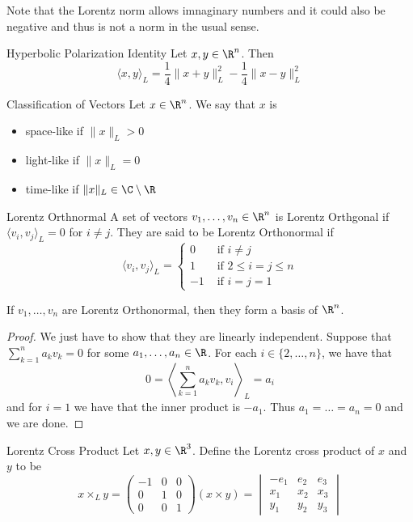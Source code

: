 \documentclass[a4paper]{article}
\begin{document}
Note that the Lorentz norm allows imnaginary numbers and it could also be negative and thus is not a norm in the usual sense. 

\begin{prp}{Hyperbolic Polarization Identity}{} Let $x,y\in\R^n$. Then $$\langle x,y\rangle_L=\frac{1}{4}\|x+y\|_L^2-\frac{1}{4}\|x-y\|_L^2$$
\end{prp}

\begin{defn}{Classification of Vectors}{} Let $x\in\R^n$. We say that $x$ is 
\begin{itemize}
\item space-like if $\|x\|_L>0$
\item light-like if $\|x\|_L=0$
\item time-like if $\|x\|_L\in\C\setminus\R$
\end{itemize}
\end{defn}

\begin{defn}{Lorentz Orthnormal}{} A set of vectors $v_1,\dots,v_n\in\R^n$ is Lorentz Orthgonal if $\langle v_i,v_j\rangle_L=0$ for $i\neq j$. They are said to be Lorentz Orthonormal if $$\langle v_i,v_j\rangle_L=\begin{cases}
0 & \text{ if }i\neq j\\
1 & \text{ if }2\leq i=j\leq n\\
-1 & \text{ if }i=j=1
\end{cases}$$
\end{defn}

\begin{lmm}{}{} If $v_1,\dots,v_n$ are Lorentz Orthonormal, then they form a basis of $\R^n$. \tcbline
\begin{proof}
We just have to show that they are linearly independent. Suppose that $\sum_{k=1}^na_kv_k=0$ for some $a_1,\dots,a_n\in\R$. For each $i\in\{2,\dots,n\}$, we have that $$0=\left\langle\sum_{k=1}^na_kv_k,v_i\right\rangle_L=a_i$$ and for $i=1$ we have that the inner product is $-a_1$. Thus $a_1=\dots=a_n=0$ and we are done. 
\end{proof}
\end{lmm}

\begin{defn}{Lorentz Cross Product}{} Let $x,y\in\R^3$. Define the Lorentz cross product of $x$ and $y$ to be $$x\times_L y=\begin{pmatrix}
-1 & 0 & 0\\
0 & 1 & 0\\
0 & 0 & 1
\end{pmatrix}(x\times y)=\begin{vmatrix}
-e_1 & e_2 & e_3\\
x_1 & x_2 & x_3\\
y_1 & y_2 & y_3
\end{vmatrix}$$
\end{defn}
\end{document}
